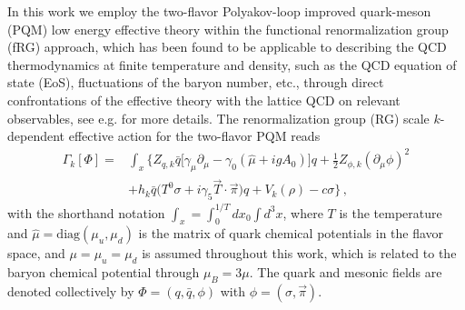 \documentclass[%
reprint,
superscriptaddress,
showpacs,preprintnumbers,
 amsmath,amssymb,
 aps,
prd,
]{revtex4-1}
\begin{document}
In this work we employ the two-flavor Polyakov-loop improved quark-meson (PQM) low energy effective theory within the functional renormalization group (fRG) approach, which has been found to be applicable to describing the QCD thermodynamics at finite temperature and density, such as the QCD equation of state (EoS), fluctuations of the baryon number, etc., through direct confrontations of the effective theory with the lattice QCD on relevant observables, see e.g. \cite{Schaefer:2004en,Skokov:2010wb,Haas:2013qwp,Herbst:2013ufa,Fu:2015naa,Fu:2016tey} for more details. The renormalization group (RG) scale $k$-dependent effective action for the two-flavor PQM reads
\begin{align}
  \Gamma_k[\Phi]=&\int_x \bigg\{Z_{q,k}\bar{q} \Big [\gamma_\mu \partial_\mu -\gamma_0(\hat\mu+igA_0) \Big ]q+\frac{1}{2}Z_{\phi,k}(\partial_\mu \phi)^2 \nonumber\\[2ex]
  &+h_k\bar{q}\big(T^0\sigma+i\gamma_5\vec{T}\cdot \vec{\pi}\big)q+V_k(\rho)-c\sigma \bigg\}\,,
\label{eq:action}
\end{align}
with the shorthand notation $\int_x=\int^{1/T}_0dx_0\int d^3x$, where $T$ is the temperature and $\hat\mu=\mathrm{diag}(\mu_u,\mu_d)$ is the matrix of quark chemical potentials in the flavor space, and $\mu=\mu_u=\mu_d$ is assumed throughout this work, which is related to the baryon chemical potential through $\mu_B=3\mu$. The quark and mesonic fields are denoted collectively by $\Phi=(q, \bar q, \phi)$ with $\phi=(\sigma,\vec{\pi})$.
\end{document}
